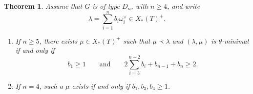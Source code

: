\documentclass[a4paper, 12pt]{amsart}
\newtheorem{theorem}{Theorem}[section]
\theoremstyle{definition}
\begin{document}
\begin{samepage}
\begin{theorem}\label{prop:minuscule-classification}
Assume that $G$ is of type $D_n$, with $n\geq 4$, and write
\[
\lambda=\sum_{i=1}^n b_i\omega_i^\vee\in X_*(T)^+.
\]
\begin{enumerate}
\item[(i)] If $n\geq 5$, there exists $\mu\in X_*(T)^+$ such that
$\mu\prec\lambda$ and $(\lambda,\mu)$ is $\theta$-minimal if and only if
\[
b_1\geq 1
\qquad\text{and}\qquad
2\sum_{i=3}^{n-2}b_i+b_{n-1}+b_n\geq 2.
\]

\item[(ii)] If $n=4$, such a $\mu$ exists if and only if 
$b_1,b_3,b_4\geq 1$.
\end{enumerate}
\end{theorem}
\end{samepage}
\end{document}
